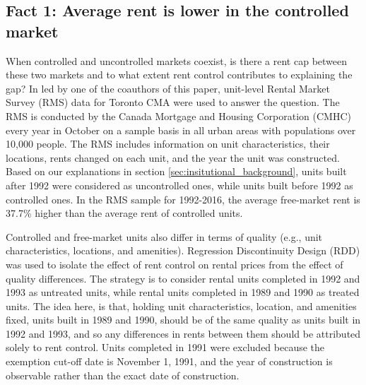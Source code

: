 \documentclass[parskip=full]{article}
\begin{document}

\subsection{Fact 1: Average rent is lower in the controlled market}\label{sec:rent_gap} 
When controlled and uncontrolled markets coexist, is there a rent cap between these two markets and to what extent rent control contributes to explaining the gap? In \citet{zhang-gou} led by one of the coauthors of this paper, unit-level Rental Market Survey (RMS) data for Toronto CMA were used to answer the question. The RMS is conducted by the Canada Mortgage and Housing Corporation (CMHC) every year in October on a sample basis in all urban areas with populations over 10,000 people. The RMS includes information on unit characteristics, their locations, rents changed on each unit, and the year the unit was constructed. Based on our explanations in section \ref{sec:insitutional_background}, units built after 1992 were considered as uncontrolled ones, while units built before 1992 as controlled ones. In the RMS sample for 1992-2016, the average free-market rent is 37.7\% higher than the average rent of controlled units. 

Controlled and free-market units also differ in terms of quality (e.g., unit characteristics, locations, and amenities). Regression Discontinuity Design (RDD) was used to isolate the effect of rent control on rental prices from the effect of quality differences. The strategy is to consider rental units completed in 1992 and 1993 as untreated units, while rental units completed in 1989 and 1990 as treated units. The idea here, is that, holding unit characteristics, location, and amenities fixed, units built in 1989 and 1990, should be of the same quality as units built in 1992 and 1993, and so any differences in rents between them should be attributed solely to rent control. Units completed in 1991 were excluded because the exemption cut-off date is November 1, 1991, and  the year of construction is observable rather than the exact date of construction. 
\end{document}
